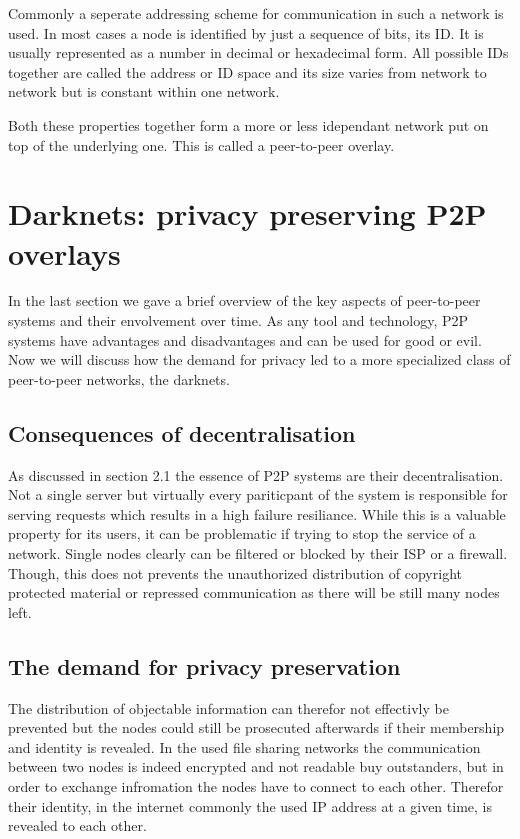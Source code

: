 Commonly a seperate addressing scheme for communication in such a network is used. In most cases a node is identified by just a sequence of bits, its ID. It is usually represented as a number in decimal or hexadecimal form. All possible IDs together are called the address or ID space and its size varies from network to network but is constant within one network.

Both these properties together form a more or less idependant network put on top of the underlying one. This is called a peer-to-peer overlay.


\section{Darknets: privacy preserving P2P overlays}

In the last section we gave a brief overview of the key aspects of peer-to-peer systems and their envolvement over time. As any tool and technology, P2P systems have advantages and disadvantages and can be used for good or evil. Now we will discuss how the demand for privacy led to a more specialized class of peer-to-peer networks, the darknets.

\subsection{Consequences of decentralisation}

As discussed in section 2.1 the essence of P2P systems are their decentralisation. Not a single server but virtually every pariticpant of the system is responsible for serving requests which results in a high failure resiliance. While this is a valuable property for its users, it can be problematic if trying to stop the service of a network. Single nodes clearly can be filtered or blocked by their ISP or a firewall. Though, this does not prevents the unauthorized distribution of copyright protected material or repressed communication as there will be still many nodes left. 

\subsection{The demand for privacy preservation}

The distribution of objectable information can therefor not effectivly be prevented but the nodes could still be prosecuted afterwards if their membership and identity is revealed. In the used file sharing networks the communication between two nodes is indeed encrypted and not readable buy outstanders, but in order to exchange infromation the nodes have to connect to each other. Therefor their identity, in the internet commonly the used IP address at a given time, is revealed to each other.

